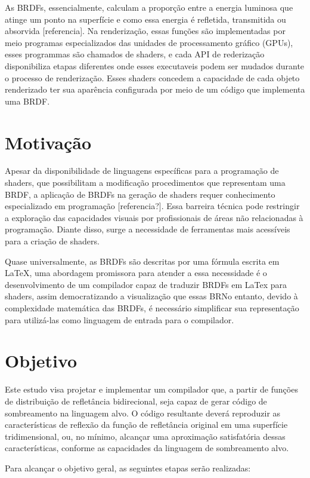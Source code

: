 \documentclass[english, 
               brazil, 
               bsc] %
               {dcomp-abntex2}
\begin{document}
As BRDFs, essencialmente, calculam a proporção entre a energia luminosa que atinge um ponto na superfície e como essa energia é refletida, transmitida ou absorvida [referencia]. Na renderização, essas funções são implementadas por meio programas especializados das unidades de processamento gráfico (GPUs), esses programmas são chamados de shaders, e cada API de rederização disponibiliza etapas diferentes onde esses executaveis podem ser mudados durante o processo de renderização. Esses shaders concedem a capacidade de cada objeto renderizado ter sua aparência configurada por meio de um código que implementa uma BRDF.


\section{Motivação}

Apesar da disponibilidade de linguagens específicas para a programação de shaders, que possibilitam a modificação procedimentos que representam uma BRDF, a aplicação de BRDFs na geração de shaders requer conhecimento especializado em programação [referencia?]. Essa barreira técnica pode restringir a exploração das capacidades visuais por profissionais de áreas não relacionadas à programação. Diante disso, surge a necessidade de ferramentas mais acessíveis para a criação de shaders.

Quase universalmente, as BRDFs são descritas por uma fórmula escrita em LaTeX, uma abordagem promissora para atender a essa necessidade é o desenvolvimento de um compilador capaz de traduzir BRDFs em LaTex para shaders, assim democratizando a visualização que essas BRNo entanto, devido à complexidade matemática das BRDFs, é necessário simplificar sua representação para utilizá-las como linguagem de entrada para o compilador.

\section{Objetivo}
Este estudo visa projetar e implementar um compilador que, a partir de funções de distribuição de refletância bidirecional, seja capaz de gerar código de sombreamento na linguagem alvo. O código resultante deverá reproduzir as características de reflexão da função de refletância original em uma superfície tridimensional, ou, no mínimo, alcançar uma aproximação satisfatória dessas características, conforme as capacidades da linguagem de sombreamento alvo.

Para alcançar o objetivo geral, as seguintes etapas serão realizadas:
\end{document}
